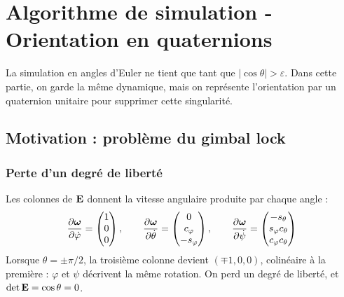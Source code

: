 
\section{Algorithme de simulation - Orientation en quaternions}

La simulation en angles d'Euler ne tient que tant que
$|\cos\theta| > \varepsilon$. Dans cette partie, on garde la même
dynamique, mais on représente l'orientation par un quaternion unitaire
pour supprimer cette singularité.

\subsection{Motivation : problème du gimbal lock}

\subsubsection{Perte d'un degré de liberté}

Les colonnes de $\mathbf{E}$ donnent la vitesse angulaire produite par
chaque angle :
\[
    \frac{\partial \bm{\omega}}{\partial \dot\varphi} = \begin{pmatrix}
        1\\ 0\\ 0
    \end{pmatrix},
    \qquad
    \frac{\partial \bm{\omega}}{\partial \dot\theta} = \begin{pmatrix}
        0\\ c_\varphi\\ -s_\varphi
    \end{pmatrix},
    \qquad
    \frac{\partial \bm{\omega}}{\partial \dot\psi} = \begin{pmatrix}
        -s_\theta\\ s_\varphi c_\theta\\ c_\varphi c_\theta
    \end{pmatrix}
\]
Lorsque $\theta = \pm\pi/2$, la troisième colonne devient
$(\mp 1, 0, 0)$, colinéaire à la première : $\varphi$ et $\psi$
décrivent la même rotation. On perd un degré de liberté, et
$\det\mathbf{E} = \cos\theta = 0$.

